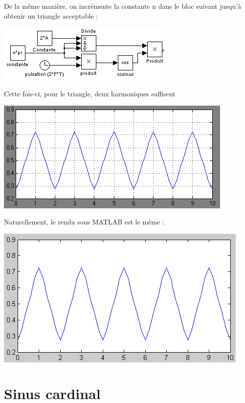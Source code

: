 \documentclass[10pt]{article}
\begin{document}
  \subsection{}
   De la même manière, on incrémente la constante n dans le bloc suivant jusqu’à obtenir un triangle acceptable :
   \begin{center}
    \includegraphics{4b}
   \end{center}
   Cette fois-ci, pour le triangle, deux harmoniques suffisent
   \begin{center}
    \includegraphics{4b-s}
   \end{center}
   Naturellement, le rendu sous MATLAB est le même :
   \begin{center}
    \includegraphics{4b-p}
   \end{center}

 \section{Sinus cardinal}
\end{document}
